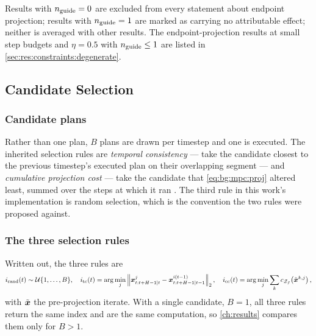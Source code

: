 Results with $n_{\textrm{guide}} = 0$ are excluded from every statement about endpoint projection; results
with $n_{\textrm{guide}} = 1$ are marked as carrying no attributable effect; neither is averaged with other
results. The endpoint-projection results at small step budgets and $\eta = 0.5$ with
$n_{\textrm{guide}} \le 1$ are listed in \autoref{sec:res:constraints:degenerate}.

\subsection{Candidate Selection}\label{sec:method:selection}

\subsubsection*{Candidate plans}

Rather than one plan, $B$ plans are drawn per timestep and one is executed. The inherited
selection rules are \emph{temporal consistency} --- take the candidate closest to the previous
timestep's executed plan on their overlapping segment --- and \emph{cumulative projection
cost} --- take the candidate that \eqref{eq:bg:mpc:proj} altered least, summed over the steps
at which it ran \parencite[Sec.~5.4]{romer2025diffusion}. The third rule in this work's implementation is random selection,
which is the convention the two rules were proposed against.

\subsubsection*{The three selection rules}

Written out, the three rules are
\begin{equation}\label{eq:method:sel:rules}
  i_{\textrm{rand}}(t) \sim \mathcal{U}\{1,\dots,B\},
  \quad
  i_{\textrm{tc}}(t) = \arg\min_{j}\left\|\boldsymbol{x}^{j}_{t:t+H-1|t} - \boldsymbol{x}^{i(t-1)}_{t:t+H-1|t-1}\right\|_{2},
  \quad
  i_{\textrm{cc}}(t) = \arg\min_{j}\sum_{k} c_{\mathcal{Z}_{f}}\!\left(\tilde{\boldsymbol{x}}^{k,j}\right),
\end{equation}
with $\tilde{\boldsymbol{x}}$ the pre-projection iterate. With a single candidate, $B=1$, all three rules
return the same index and are the same computation, so \autoref{ch:results} compares them only for
$B>1$.

